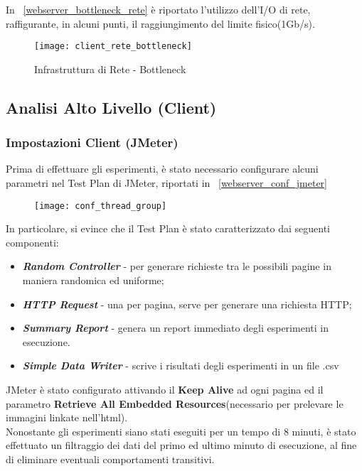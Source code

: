 In \figurename~\ref{webserver_bottleneck_rete} è riportato l'utilizzo dell'I/O di rete,
raffigurante, in alcuni punti, il raggiungimento del limite fisico(1Gb/s).\\
\begin{figure}[!htbp]
  \centering
  \texttt{[image: client\_rete\_bottleneck]}
  \caption{Infrastruttura di Rete - Bottleneck}
  \label{webserver_webserver_bottleneck_rete}
\end{figure}

\clearpage

\subsection{Analisi Alto Livello (Client)}
\subsubsection*{Impostazioni Client (JMeter)}
Prima di effettuare gli esperimenti, è stato necessario configurare alcuni parametri
nel Test Plan di JMeter, riportati in \figurename~\ref{webserver_conf_jmeter}

\begin{figure}[!htbp]
  \centering
  \texttt{[image: conf\_thread\_group]}
  \caption{}
  \label{webserver_webserver_conf_jmeter}
\end{figure}

In particolare, si evince che il Test Plan è stato caratterizzato dai seguenti
componenti:

\begin{itemize}
  \item \textbf{\textit{Random Controller}} - per generare richieste tra le possibili
  pagine in maniera randomica ed uniforme;
  \item \textbf{\textit{HTTP Request}} - una per pagina, serve per generare una
  richiesta HTTP;
  \item \textbf{\textit{Summary Report}} - genera un report immediato degli esperimenti
  in esecuzione.
  \item \textbf{\textit{Simple Data Writer}} - scrive i risultati degli esperimenti
  in un file .csv
\end{itemize}

JMeter è stato configurato attivando il \textbf{Keep Alive} ad ogni pagina
ed il parametro \textbf{Retrieve All Embedded Resources}(necessario per prelevare
le immagini linkate nell'html).\\
Nonostante gli esperimenti siano stati eseguiti per un tempo di 8 minuti, è stato
effettuato un filtraggio dei dati del primo ed ultimo minuto di esecuzione, al fine
di eliminare eventuali comportamenti transitivi.\\

